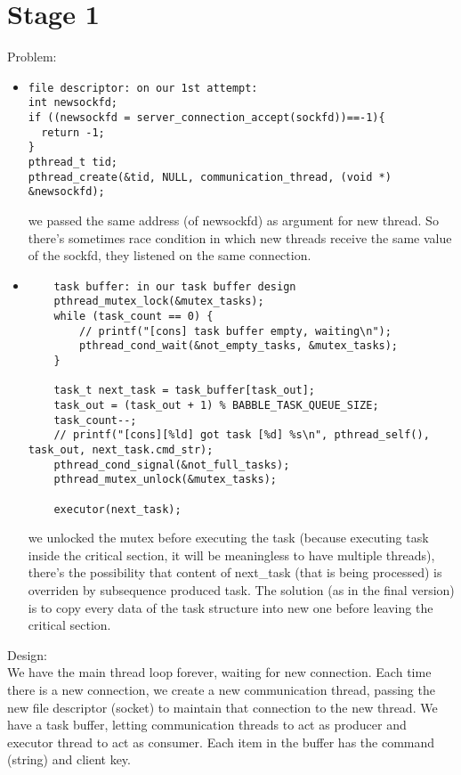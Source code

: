\documentclass{article}
\begin{document}
\section{Stage 1}
Problem:
\begin{itemize}
\item \begin{lstlisting}file descriptor: on our 1st attempt:
int newsockfd;
if ((newsockfd = server_connection_accept(sockfd))==-1){
  return -1;
}
pthread_t tid;
pthread_create(&tid, NULL, communication_thread, (void *) &newsockfd);
\end{lstlisting}
we passed the same address (of newsockfd) as argument for new thread. So there's sometimes race condition in which new threads receive the same value of the sockfd, they listened on the same connection.
\item \begin{lstlisting}
	task buffer: in our task buffer design
    pthread_mutex_lock(&mutex_tasks);
    while (task_count == 0) {
        // printf("[cons] task buffer empty, waiting\n");
        pthread_cond_wait(&not_empty_tasks, &mutex_tasks);
    }

    task_t next_task = task_buffer[task_out];
    task_out = (task_out + 1) % BABBLE_TASK_QUEUE_SIZE;
    task_count--;
    // printf("[cons][%ld] got task [%d] %s\n", pthread_self(), task_out, next_task.cmd_str);
    pthread_cond_signal(&not_full_tasks);
    pthread_mutex_unlock(&mutex_tasks);

    executor(next_task);
\end{lstlisting}
we unlocked the mutex before executing the task (because executing task inside the critical section, it will be meaningless to have multiple threads),
there's the possibility that content of next\_task (that is being processed) is overriden by subsequence produced task.
The solution (as in the final version) is to copy every data of the task structure into new one before leaving the critical section.
\end{itemize}
Design:\\
We have the main thread loop forever, waiting for new connection. Each time there is a new connection, we create a new communication thread, passing the new file descriptor (socket) to maintain that connection to the new thread.
We have a task buffer, letting communication threads to act as producer and executor thread to act as consumer.
Each item in the buffer has the command (string) and client key.
\\\\
\end{document}
